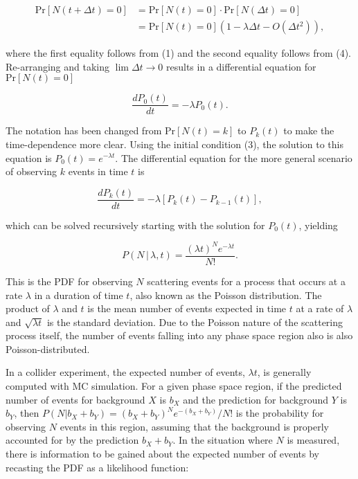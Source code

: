 \begin{equation}
\begin{aligned}
\textrm{Pr}\left[N(t+\Delta{t}) = 0 \right] & = \textrm{Pr}\left[N(t)
= 0\right]\cdot\textrm{Pr}\left[N(\Delta{t}) = 0\right] \\
& = \textrm{Pr}\left[N(t) = 0\right]\left(1 - \lambda\Delta{t} - O(\Delta{t}^2)\right),
\end{aligned}
\end{equation}

\noindent
where the first equality follows from (1) and the second equality
follows from (4). Re-arranging and taking
$\lim{\Delta{t} \to 0}$ results in a differential equation for
$\textrm{Pr}\left[N(t)= 0\right]$

\begin{equation}
\frac{dP_0(t)}{dt} = -\lambda{P_0(t)}.
\end{equation}

\noindent
The notation has been changed from $\textrm{Pr}\left[ N(t) =
k \right]$ to $P_k(t)$ to make the time-dependence more clear. Using
the initial condition (3), the solution to this equation is $P_0(t) =
e^{-\lambda{t}}$. The differential equation for the more general
scenario of observing $k$ events in time $t$ is 

\begin{equation}
\frac{dP_k(t)}{dt} = -\lambda\left[P_k(t) - P_{k-1}(t)\right],
\end{equation}

\noindent
which can be solved recursively starting with the solution for
$P_0(t)$, yielding

\begin{equation}
P(N\,|\,\lambda,t) = \frac{(\lambda{t})^N e^{-\lambda{t}}}{N!}.
\end{equation}

\noindent
This is the PDF for observing $N$ scattering events for a process
that occurs at a rate $\lambda$ in a duration of time $t$, also known
as the Poisson distribution. The
product of $\lambda$ and $t$ is the mean number of events expected in
time $t$ at a rate of $\lambda$ and
$\sqrt{\lambda{t}}$ is the standard deviation. Due to the Poisson
nature of the scattering process itself, the number of events falling
into any phase space region also is also Poisson-distributed. 

In a collider experiment, the expected number of events, $\lambda{t}$,
is generally computed with MC simulation. For a given phase space
region, if the predicted number of events for background $X$ is $b_X$
and the prediction for background $Y$ is $b_Y$,
then $P(N|b_X+b_Y) = (b_X+b_Y)^N e^{-(b_X+b_Y)}/N!$ is the probability for observing $N$
events in this region, assuming that the background is properly
accounted for by the prediction $b_X+b_Y$. In the situation where $N$ is
measured, there is information to be gained about the expected number
of events by recasting the PDF as a likelihood function:

